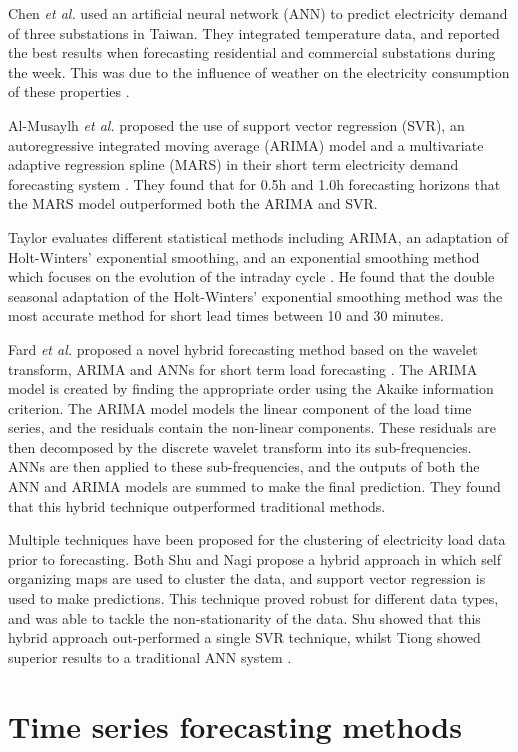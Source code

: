 Chen \textit{et al.} used an artificial neural network (ANN) to predict electricity demand of three substations in Taiwan. They integrated temperature data, and reported the best results when forecasting residential and commercial substations during the week. This was due to the influence of weather on the electricity consumption of these properties \cite{Chen1996}. 

Al-Musaylh \textit{et al.} proposed the use of support vector regression (SVR), an autoregressive integrated moving average (ARIMA) model and a multivariate adaptive regression spline (MARS) in their short term electricity demand forecasting system \cite{Al-Musaylh2018}. They found that for 0.5h and 1.0h forecasting horizons that the MARS model outperformed both the ARIMA and SVR.

Taylor evaluates different statistical methods including ARIMA, an adaptation of Holt-Winters' exponential smoothing, and an exponential smoothing method which focuses on the evolution of the intraday cycle \cite{Taylor2008}. He found that the double seasonal adaptation of the Holt-Winters' exponential smoothing method was the most accurate method for short lead times between 10 and 30 minutes. 

Fard \textit{et al.} proposed a novel hybrid forecasting method based on the wavelet transform, ARIMA and ANNs for short term load forecasting \cite{Fard2014}. The ARIMA model is created by finding the appropriate order using the Akaike information criterion. The ARIMA model models the linear component of the load time series, and the residuals contain the non-linear components. These residuals are then decomposed by the discrete wavelet transform into its sub-frequencies. ANNs are then applied to these sub-frequencies, and the outputs of both the ANN and ARIMA models are summed to make the final prediction. They found that this hybrid technique outperformed traditional methods.

Multiple techniques have been proposed for the clustering of electricity load data prior to forecasting. Both Shu and Nagi propose a hybrid approach in which self organizing maps are used to cluster the data, and support vector regression is used to make predictions. This technique proved robust for different data types, and was able to tackle the non-stationarity of the data. Shu showed that this hybrid approach out-performed a single SVR technique\cite{Shu2006}, whilst Tiong showed superior results to a traditional ANN system \cite{Tiong2008}.


\section{Time series forecasting methods}

